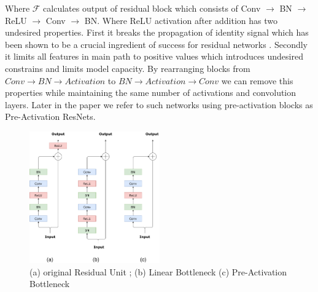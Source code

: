 Where $\mathcal{F}$ calculates output of residual block which consists of Conv $\rightarrow$ BN $\rightarrow$ ReLU $\rightarrow$ Conv $\rightarrow$ BN. Where ReLU activation after addition has two undesired properties. First it breaks the propagation of identity signal which has been shown to be a crucial ingredient of success for residual networks \cite{chao2019_hardnet}. Secondly it limits all features in main path to positive values which introduces undesired constrains and limits model capacity. By rearranging blocks from $Conv \rightarrow BN \rightarrow Activation$ to $BN \rightarrow Activation \rightarrow Conv$ we can remove this properties while maintaining the same number of activations and convolution layers. Later in the paper we refer to such networks using pre-activation blocks as Pre-Activation ResNets.



\begin{figure}[h!]
  \centering
  \includegraphics[width=0.5\textwidth]{images/blocks.pdf}
  \caption{ (a) original Residual Unit \cite{he2016deep_resnetv1}; (b) Linear Bottleneck \cite{sandler2018_mobilenetv2} (c) Pre-Activation Bottleneck \cite{he2016identity_resnetv2}}
  \label{fig: pre-act}
\end{figure}


